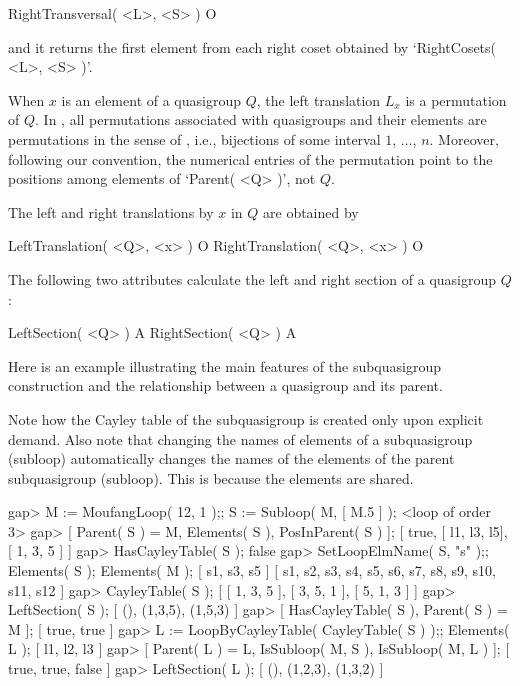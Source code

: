 \>RightTransversal( <L>, <S> ) O

and it returns the first element from each right coset obtained by
`RightCosets( <L>, <S> )'.


When $x$ is an element of a quasigroup $Q$, the left translation $L_x$ is a
permutation of $Q$. In {\LOOPS}, all permutations associated with quasigroups
and their elements are permutations in the sense of \GAP, i.e., bijections of
some interval $1$, $\dots$, $n$. Moreover, following our convention, the
numerical entries of the permutation point to the positions among elements of
`Parent( <Q> )', not $Q$.

The left and right translations by $x$ in $Q$ are obtained by

\>LeftTranslation( <Q>, <x> ) O
\>RightTranslation( <Q>, <x> ) O

The following two attributes calculate the left and right section of a
quasigroup $Q$:

\>LeftSection( <Q> ) A
\>RightSection( <Q> ) A

Here is an example illustrating the main features of the subquasigroup
construction and the relationship between a quasigroup and its parent.

Note how the Cayley table of the subquasigroup is created only upon explicit
demand. Also note that changing the names of elements of a subquasigroup
(subloop) automatically changes the names of the elements of the parent
subquasigroup (subloop). This is because the elements are shared.

\beginexample
gap> M := MoufangLoop( 12, 1 );; S := Subloop( M, [ M.5 ] );
<loop of order 3>
gap> [ Parent( S ) = M, Elements( S ), PosInParent( S ) ];
[ true, [ l1, l3, l5], [ 1, 3, 5 ] ]
gap> HasCayleyTable( S );
false
gap> SetLoopElmName( S, "s" );; Elements( S ); Elements( M );
[ s1, s3, s5 ]
[ s1, s2, s3, s4, s5, s6, s7, s8, s9, s10, s11, s12 ]
gap> CayleyTable( S );
[ [ 1, 3, 5 ], [ 3, 5, 1 ], [ 5, 1, 3 ] ]
gap> LeftSection( S );
[ (), (1,3,5), (1,5,3) ]
gap> [ HasCayleyTable( S ), Parent( S ) = M ];
[ true, true ]
gap> L := LoopByCayleyTable( CayleyTable( S ) );; Elements( L );
[ l1, l2, l3 ]
gap> [ Parent( L ) = L, IsSubloop( M, S ), IsSubloop( M, L ) ];
[ true, true, false ]
gap> LeftSection( L );
[ (), (1,2,3), (1,3,2) ]
\endexample


